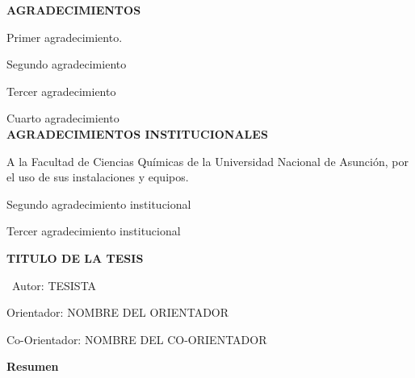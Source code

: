 \documentclass[12pt,oneside,a4paper]{report}
\begin{document}
\newpage
\thispagestyle{plain}
\begin{center}
\textbf{AGRADECIMIENTOS}\\
\vspace{1cm}

Primer agradecimiento.\\

\vspace{1cm}

Segundo agradecimiento\\

\vspace{1cm}

Tercer agradecimiento\\

\vspace{1cm}

Cuarto agradecimiento\\


\newpage
\thispagestyle{plain}
\textbf{AGRADECIMIENTOS INSTITUCIONALES}\\

\vspace{1cm}

A la Facultad de Ciencias Químicas de la Universidad Nacional de Asunción, por el uso de sus instalaciones y equipos.

\vspace{1cm}

Segundo agradecimiento institucional

\vspace{1cm}

Tercer agradecimiento institucional

\vspace{1cm}


\end{center}




\newpage
\thispagestyle{plain}

\begin{center}
\large{\textbf{{TITULO DE LA TESIS}}}\\
\end{center}

\normalsize
\
 \hfill Autor: TESISTA

\hfill Orientador: NOMBRE DEL ORIENTADOR

\hfill Co-Orientador: NOMBRE DEL CO-ORIENTADOR


\textbf{Resumen}
\end{document}
